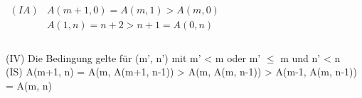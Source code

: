 $\begin{aligned}
(IA) &A(m+1, 0) = A(m, 1) > A(m, 0)\\
&A(1, n) = n + 2 > n + 1 = A(0, n)\\
\end{aligned}$
\\ \ \\
(IV) Die Bedingung gelte für (m', n') mit m' < m oder m' $\leq$ m und n' < n\\
(IS) A(m+1, n) = A(m, A(m+1, n-1)) > A(m, A(m, n-1)) > A(m-1, A(m, n-1)) = A(m, n)